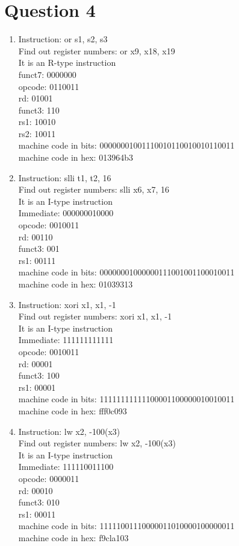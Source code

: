 \documentclass[12pt,letterpaper]{article}
\begin{document}
\section*{Question 4}

\begin{enumerate}
\item
Instruction: or s1, s2, s3
\\Find out register numbers: or x9, x18, x19
\\It is an R-type instruction
\\funct7: 0000000
\\opcode: 0110011
\\rd: 01001
\\funct3: 110
\\rs1: 10010
\\rs2: 10011
\\machine code in bits: 00000001001110010110010010110011
\\machine code in hex: 013964b3

\item
Instruction: slli t1, t2, 16
\\Find out register numbers: slli x6, x7, 16
\\It is an I-type instruction
\\Immediate: 000000010000
\\opcode: 0010011
\\rd: 00110
\\funct3: 001
\\rs1: 00111
\\machine code in bits: 00000001000000111001001100010011
\\machine code in hex: 01039313

\item
Instruction: xori x1, x1, -1
\\Find out register numbers: xori x1, x1, -1
\\It is an I-type instruction
\\Immediate: 111111111111
\\opcode: 0010011
\\rd: 00001
\\funct3: 100
\\rs1: 00001
\\machine code in bits: 11111111111100001100000010010011
\\machine code in hex: fff0c093

\item
Instruction: lw x2, -100(x3)
\\Find out register numbers: lw x2, -100(x3)
\\It is an I-type instruction
\\Immediate: 111110011100
\\opcode: 0000011
\\rd: 00010
\\funct3: 010
\\rs1: 00011
\\machine code in bits: 11111001110000011010000100000011
\\machine code in hex: f9cla103

\end{enumerate}
\end{document}
